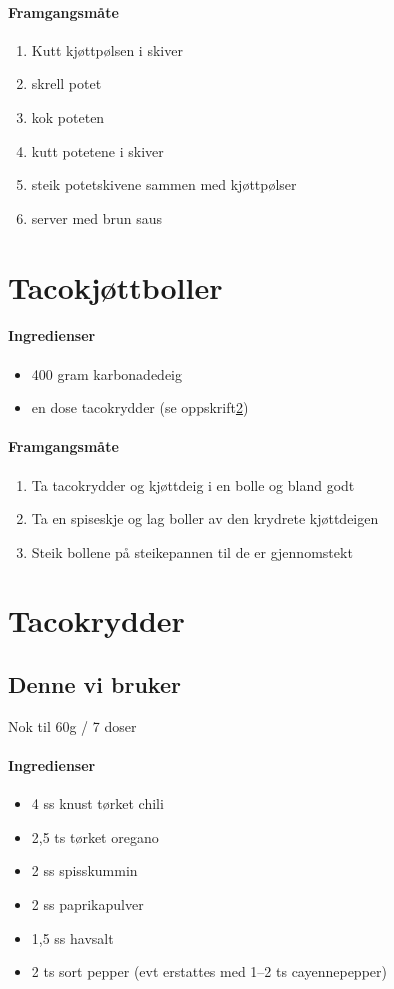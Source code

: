 \documentclass[12pt,a4paper]{book}
\begin{document}
{\paragraph{Framgangsmåte}
\begin{enumerate}[noitemsep]
	\item Kutt kjøttpølsen i skiver
	\item skrell potet
	\item kok poteten
	\item kutt potetene i skiver
	\item steik potetskivene sammen med kjøttpølser
	\item server med brun saus
\end{enumerate}
\clearpage{}
\clearpage{}\section{﻿Tacokjøttboller}

\paragraph{Ingredienser}
\begin{itemize}[noitemsep]
	\item 400 gram karbonadedeig
	\item en dose tacokrydder (se oppskrift\ref{tacokrydder})
\end{itemize}

\paragraph{Framgangsmåte}
\begin{enumerate}[noitemsep]
	\item Ta tacokrydder og kjøttdeig i en bolle og bland godt
	\item Ta en spiseskje og lag boller av den krydrete kjøttdeigen
	\item Steik bollene på steikepannen til de er gjennomstekt
\end{enumerate}
\clearpage{}
\clearpage{}\section{﻿Tacokrydder}
\label{tacokrydder}

\subsection{Denne vi bruker}
Nok til 60g / 7 doser
\paragraph{Ingredienser}
\begin{itemize}[noitemsep]
	\item 4 ss knust tørket chili
	\item 2,5 ts tørket oregano
	\item 2 ss spisskummin
	\item 2 ss paprikapulver
	\item 1,5 ss havsalt
	\item 2 ts sort pepper (evt erstattes med 1--2 ts cayennepepper)
\end{itemize}

}
\end{document}
